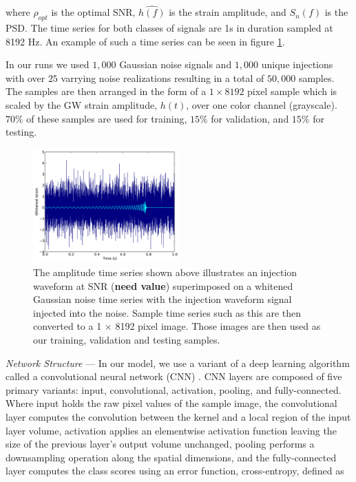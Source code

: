\documentclass[%
 amsmath,amssymb,
 aps,
 twocolumn,
 prl,
 reprint,
floatfix,
]{revtex4-1}
\begin{document}
where $\rho_{opt}$ is the optimal SNR, $\hat{h(f)}$ is the strain amplitude,
and $S_{n}(f)$ is the PSD. The time series for both classes of signals are 1s
in duration sampled at 8192 Hz. An example of such a time series can be seen in
figure \ref{fig:waveform}. 

In our runs we used $1,000$ Gaussian noise signals and $1,000$ unique
injections with over $25$ varrying noise realizations resulting in a total of
$50,000$ samples. The samples are then arranged in the form of a $1 \times
8192$ pixel sample which is scaled by the GW strain amplitude, $h(t)$, over one
color channel (grayscale). $70\%$ of these samples are used for training,
$15\%$ for validation, and $15\%$ for testing. 

\begin{figure} 
\includegraphics[width=0.5\textwidth]{figures/waveform.pdf}
\caption{\label{fig:waveform} The amplitude time series shown above illustrates
an injection waveform at SNR (\textbf{need value}) superimposed on a whitened
Gaussian noise time series with the injection waveform signal injected into the
noise. Sample time series such as this are then converted to a 1 $\times$ 8192
pixel image. Those images are then used as our training, validation and testing
samples.}
\end{figure}

\textit{Network Structure} --- In our model, we use a variant of a deep
learning algorithm called a convolutional neural network (CNN) \cite{726791}.
CNN layers are composed of five primary variants: input, convolutional,
activation, pooling, and fully-connected. Where input holds the raw pixel
values of the sample image, the convolutional layer computes the convolution
between the kernel and a local region of the input layer volume, activation
applies an elementwise activation function leaving the size of the previous
layer's output volume unchanged, pooling performs a downsampling operation
along the spatial dimensions, and the fully-connected layer computes the class
scores using an error function, cross-entropy, defined as
\end{document}
